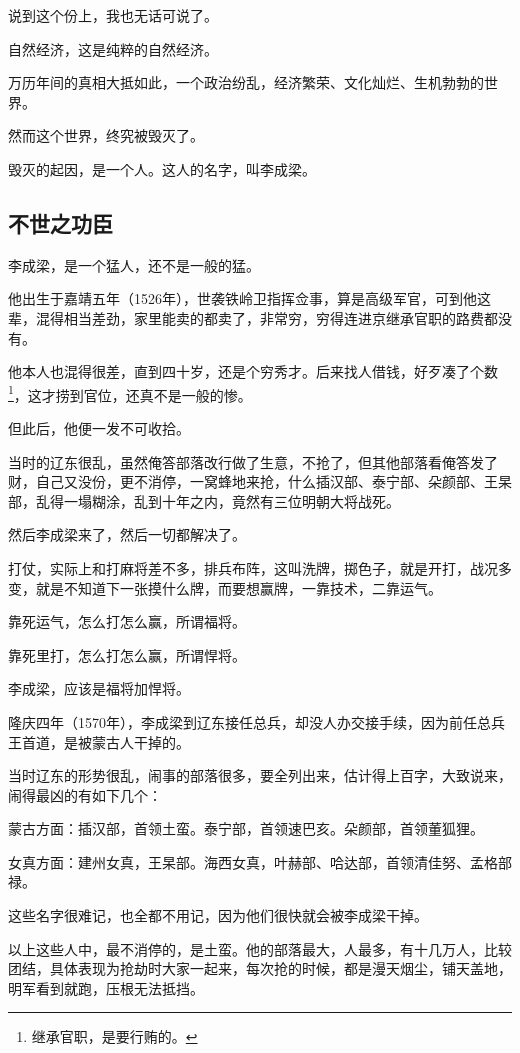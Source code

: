 \begin{multicols}{\theparacolNo}
		说到这个份上，我也无话可说了。

		自然经济，这是纯粹的自然经济。

		万历年间的真相大抵如此，一个政治纷乱，经济繁荣、文化灿烂、生机勃勃的世界。

		然而这个世界，终究被毁灭了。

		毁灭的起因，是一个人。这人的名字，叫李成梁。

		\subsection{不世之功臣}
		李成梁，是一个猛人，还不是一般的猛。

		他出生于嘉靖五年（1526年），世袭铁岭卫指挥佥事，算是高级军官，可到他这辈，混得相当差劲，家里能卖的都卖了，非常穷，穷得连进京继承官职的路费都没有。

		他本人也混得很差，直到四十岁，还是个穷秀才。后来找人借钱，好歹凑了个数\footnote{继承官职，是要行贿的。}，这才捞到官位，还真不是一般的惨。

		但此后，他便一发不可收拾。

		当时的辽东很乱，虽然俺答部落改行做了生意，不抢了，但其他部落看俺答发了财，自己又没份，更不消停，一窝蜂地来抢，什么插汉部、泰宁部、朵颜部、王杲部，乱得一塌糊涂，乱到十年之内，竟然有三位明朝大将战死。

		然后李成梁来了，然后一切都解决了。

		打仗，实际上和打麻将差不多，排兵布阵，这叫洗牌，掷色子，就是开打，战况多变，就是不知道下一张摸什么牌，而要想赢牌，一靠技术，二靠运气。

		靠死运气，怎么打怎么赢，所谓福将。

		靠死里打，怎么打怎么赢，所谓悍将。

		李成梁，应该是福将加悍将。

		隆庆四年（1570年），李成梁到辽东接任总兵，却没人办交接手续，因为前任总兵王首道，是被蒙古人干掉的。

		当时辽东的形势很乱，闹事的部落很多，要全列出来，估计得上百字，大致说来，闹得最凶的有如下几个：

		蒙古方面：插汉部，首领土蛮。泰宁部，首领速巴亥。朵颜部，首领董狐狸。

		女真方面：建州女真，王杲部。海西女真，叶赫部、哈达部，首领清佳努、孟格部禄。

		这些名字很难记，也全都不用记，因为他们很快就会被李成梁干掉。

		以上这些人中，最不消停的，是土蛮。他的部落最大，人最多，有十几万人，比较团结，具体表现为抢劫时大家一起来，每次抢的时候，都是漫天烟尘，铺天盖地，明军看到就跑，压根无法抵挡。


\end{multicols}
